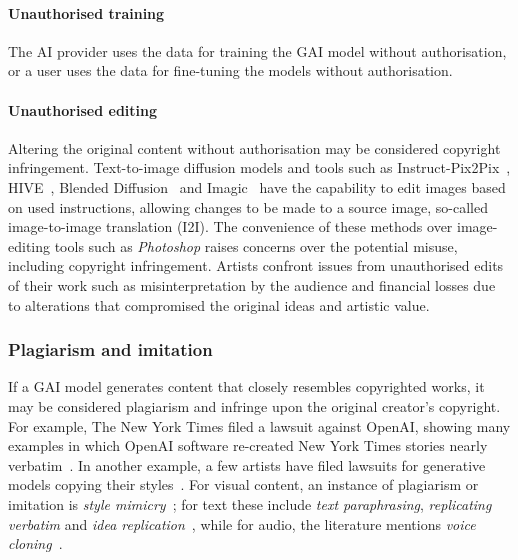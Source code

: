 \documentclass[conference]{IEEEtran}
\begin{document}
        \paragraph{Unauthorised training} The AI provider uses the data for training the GAI model without authorisation, or a user uses the data for fine-tuning the models without authorisation. %
        \paragraph{Unauthorised editing} Altering the original content without authorisation may be considered copyright infringement. 
        Text-to-image diffusion models and tools such as Instruct-Pix2Pix~\cite{brooks_instructpix2pix_2023}, HIVE~\cite{zhang_hive_2023}, Blended Diffusion~\cite{avrahami_blended_2022} and Imagic~\cite{kawar_imagic_2023} have the capability to edit images based on used instructions, allowing changes to be made to a source image, so-called image-to-image translation (I2I). 
        The convenience of these methods over image-editing tools such as \textit{Photoshop} raises concerns over the potential misuse, including copyright infringement. 
        Artists confront issues from unauthorised edits of their work such as misinterpretation by the audience and financial losses due to alterations that compromised the original ideas and artistic value. 
   \subsubsection{Plagiarism and imitation} 
   If a GAI model generates content that closely resembles copyrighted works, it may be considered plagiarism and infringe upon the original creator's copyright. 
    For example, The New York Times filed a lawsuit against OpenAI, showing many examples in which OpenAI software re-created New York Times stories nearly verbatim~\cite{grynbaum_new_2023}. 
    In another example, a few artists have filed lawsuits for generative models copying their styles~\cite{brittain_judge_2023}.
    For visual content, an instance of plagiarism or imitation is \textit{style mimicry}~\cite{gal_image_2022}; for text these include \textit{text paraphrasing}, \textit{replicating verbatim} and \textit{idea replication}~\cite{lee_language_2023}, while for audio, the literature mentions \textit{voice cloning}~\cite{qian_autovc_2019}.
\end{document}
